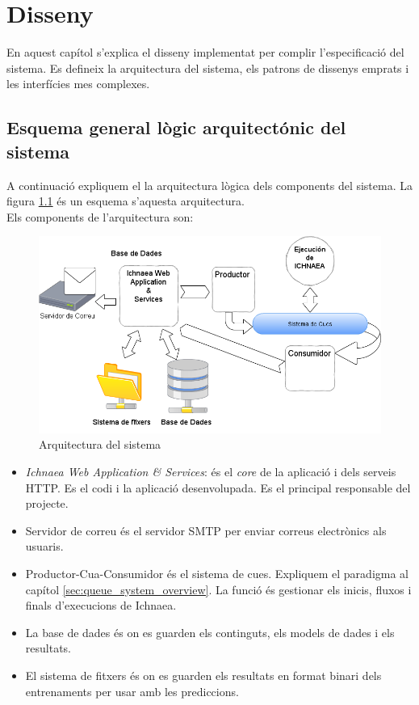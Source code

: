 \chapter{Disseny}
\label{cha:dessign}

En aquest cap\'{i}tol s'explica el disseny implementat per complir l'especificació del sistema. Es defineix la arquitectura del sistema, els patrons de dissenys emprats i les interfícies mes complexes. 

\section{Esquema general l\`{o}gic arquitect\'{o}nic del sistema}
A continuació expliquem el la arquitectura lògica dels components del sistema. La figura \ref{fig:archsoftware} \'{e}s un esquema s'aquesta arquitectura.\\

Els components de l'arquitectura son:

\begin{figure}[h!]
  \includegraphics[scale=0.5]{img/design/ArchitectureSoftware.png}
  \caption{Arquitectura del sistema}
  \label{fig:archsoftware}
\end{figure}

\begin{itemize}
\item \textit{Ichnaea Web Application \& Services}: \'{e}s el \textit{core} de la aplicaci\'{o} i dels serveis HTTP. Es el codi i la aplicació desenvolupada. Es el principal responsable del projecte.
\item Servidor de correu \'{e}s el servidor SMTP per enviar correus electr\`{o}nics als usuaris.
\item Productor-Cua-Consumidor \'{e}s el sistema de cues. Expliquem el paradigma al cap\'{i}tol \ref{sec:queue_system_overview}. La funci\'{o} \'{e}s gestionar els inicis, fluxos i finals d'execucions de Ichnaea.
\item La base de dades \'{e}s on es guarden els continguts, els models de dades i els resultats.
\item El sistema de fitxers \'{e}s on es guarden els resultats en format binari dels entrenaments per usar amb les prediccions.
\end{itemize}


